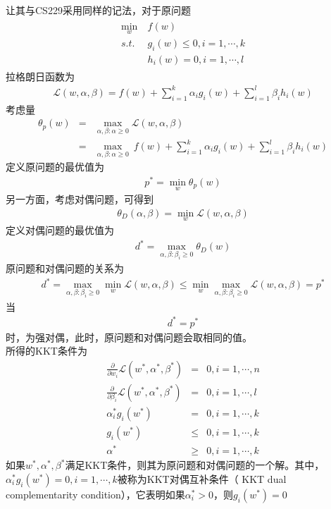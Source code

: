 让其与CS229采用同样的记法，对于原问题
\begin{eqnarray}
\begin{aligned}
\min_w &\ f(w)\\
s.t. &\ g_i(w)\leq0,i=1,\cdots,k\\
&\ h_i(w)=0,i=1,\cdots,l
\end{aligned}
\end{eqnarray}
拉格朗日函数为
\begin{eqnarray}
\mathcal{L}(w,\alpha,\beta)=f(w)+\sum_{i=1}^k\alpha_ig_i(w)+\sum_{i=1}^l\beta_ih_i(w)
\end{eqnarray}
考虑量
\begin{eqnarray}
\theta_p(w)&=&\max_{\alpha,\beta:\alpha\geq0}\mathcal{L}(w,\alpha,\beta)\\
&=&\max_{\alpha,\beta:\alpha\geq0}\ f(w)+\sum_{i=1}^k\alpha_ig_i(w)+\sum_{i=1}^l\beta_ih_i(w)
\end{eqnarray}
定义原问题的最优值为
\begin{eqnarray}
p^*=\min_w\theta_p(w)
\end{eqnarray}
另一方面，考虑对偶问题，可得到
\begin{eqnarray}
\theta_D(\alpha,\beta)=\min_w\mathcal{L}(w,\alpha,\beta)
\end{eqnarray}
定义对偶问题的最优值为
\begin{eqnarray}
d^*=\max_{\alpha,\beta:\beta_i\geq0}\theta_D(w)
\end{eqnarray}
原问题和对偶问题的关系为
\begin{eqnarray}
d^*=\max_{\alpha,\beta:\beta_i\geq0}\min_w\mathcal{L}(w,\alpha,\beta)\leq \min_w\max_{\alpha,\beta:\beta_i\geq0}\mathcal{L}(w,\alpha,\beta)=p^*
\end{eqnarray}
当
\begin{eqnarray}
d^*=p^*
\end{eqnarray}
时，为强对偶，此时，原问题和对偶问题会取相同的值。\\

所得的KKT条件为
\begin{eqnarray}
\frac{\partial}{\partial w_i}\mathcal{L}(w^*,\alpha^*,\beta^*)&=&0,i=1,\cdots,n\\
\frac{\partial}{\partial \beta_i}\mathcal{L}(w^*,\alpha^*,\beta^*)&=&0,i=1,\cdots,l\\
\alpha_i^*g_i(w^*)&=&0,i=1,\cdots,k\\
g_i(w^*)&\leq&0,i=1,\cdots,k\\
\alpha^*&\geq& 0,i=1,\cdots,k
\end{eqnarray}
如果$w^*,\alpha^*,\beta^*$满足KKT条件，则其为原问题和对偶问题的一个解。其中，$\alpha_i^*g_i(w^*)=0,i=1,\cdots,k$被称为KKT对偶互补条件（ KKT dual complementarity condition），它表明如果$\alpha_i^*>0$，则$g_i(w^*)=0$
